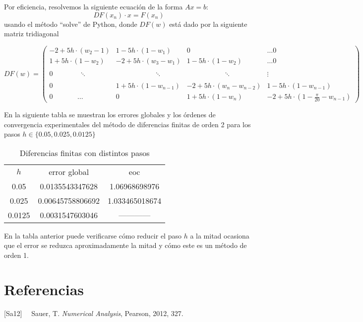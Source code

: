\documentclass[spanish]{article}
\begin{document}
Por eficiencia, resolvemos la siguiente ecuación de la forma $Ax = b$:
$$
DF(x_n) \cdot x = F(x_n)
$$
usando el método “solve” de Python, donde $DF(w)$ está dado por la siguiente matriz tridiagonal 
\begin{adjustwidth*}{-2.9cm}{-2.2cm}
$$
DF(w) = 
\begin{pmatrix}
-2+5h \cdot (w_2-1)  & 1-5h \cdot (1-w_1)   & 0 & \dots 0\\
1+5h \cdot (1-w_2)  & -2+5h \cdot (w_3-w_1)  & 1-5h \cdot (1-w_2) & \dots 0\\
\\
0 \ \  \ \ \ \ \ \ \ \ \ \ \ \  \ \  \ \ddots & \ \ \ \ \ \ \ \ \  \ \ \ \ \ \  \ \ \ \ \ \ \ \ \ \  \  \ddots & \ \ \ \ \ \ \ \ \ \ \ \ \  \ \ \ \  \ \ \  \ \ \ \ \ \ddots & \vdots \\
\\

0 \ \  \ \ \ \ \ \ \ \ \ \ \ \ \ \ \ \  \ \  \  & 1+5h \cdot (1-w_{n-1})  & -2+5h \cdot (w_n-w_{n-2})  & 1-5h \cdot (1-w_{n-1}) \\
0 \ \  \ \ \ \ \ \ \ \ \ \ \ \ \ \ \dots & 0 & 1+5h \cdot (1-w_{n})  & -2+5h \cdot (1 - \frac{\pi}{20}-w_{n-1})
\end{pmatrix}
$$
\end{adjustwidth*}

En la siguiente tabla se muestran los errores globales y los órdenes de convergencia experimentales del método de diferencias finitas de orden 2 para los pasos $h \in \{ 0.05, 0.025,  0.0125 \}$

\begin{table}[h]
\caption{Diferencias finitas con distintos pasos}
\centering
\begin{tabular}{ccc}
\hline \hline
$h$ & error global & eoc \\
0.05 & 0.0135543347628 & 1.06968698976 \\
0.025 & 0.00645758806692 & 1.033465018674 \\
0.0125 & 0.0031547603046  & ------------ \\
\hline
\end{tabular}
\label{tab:hresult}
\end{table}
En la tabla anterior puede verificarse cómo reducir el paso $h$ a la mitad ocasiona que el error se reduzca aproximadamente la mitad y cómo este es un método de orden 1.

\section{Referencias}

[Sa12]  \ \  Sauer, T. \textit{Numerical Analysis}, Pearson, 2012, 327.
\end{document}
